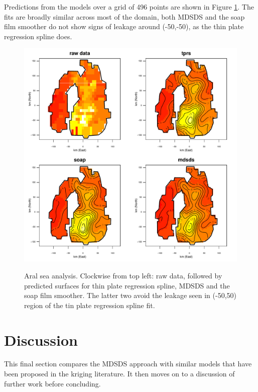\documentclass[useAMS, referee]{biom}
\begin{document}
Predictions from the models over a grid of 496 points are shown in Figure \ref{aral-plot}. The fits are broadly similar across most of the domain, both MDSDS and the soap film smoother do not show signs of leakage around (-50,-50), as the thin plate regression spline does.


\begin{figure}
\centering
\includegraphics[width=\textwidth]{examples/aral/aral-plot.pdf} \\
\caption{Aral sea analysis. Clockwise from top left: raw data, followed by predicted surfaces for thin plate regression spline, MDSDS and the soap film smoother. The latter two avoid the leakage seen in (-50,50) region of the tin plate regression spline fit.}
\label{aral-plot}
\end{figure}




\section{Discussion}
\label{conclusion}

This final section compares the MDSDS approach with similar models that have been proposed in the kriging literature. It then moves on to a discussion of further work before concluding.
\end{document}
